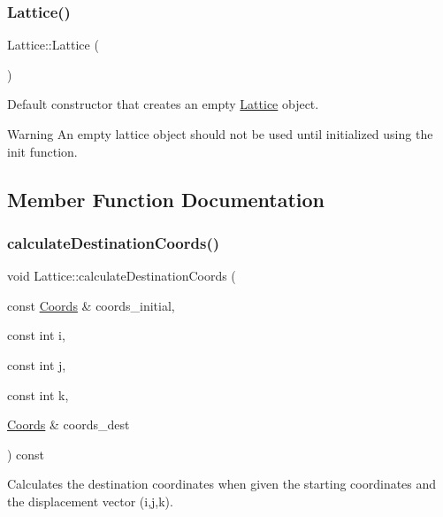 \subsubsection{\texorpdfstring{Lattice()}{Lattice()}}
{\footnotesize\ttfamily Lattice\+::\+Lattice (\begin{DoxyParamCaption}{ }\end{DoxyParamCaption})}



Default constructor that creates an empty \hyperlink{class_lattice}{Lattice} object. 

\begin{DoxyWarning}{Warning}
An empty lattice object should not be used until initialized using the init function. 
\end{DoxyWarning}


\subsection{Member Function Documentation}
\mbox{\label{class_lattice_aa6b80d6264bfc23ae5fea39abd2557d5}} 
\subsubsection{\texorpdfstring{calculate\+Destination\+Coords()}{calculateDestinationCoords()}}
{\footnotesize\ttfamily void Lattice\+::calculate\+Destination\+Coords (\begin{DoxyParamCaption}\item[{const \hyperlink{struct_coords}{Coords} \&}]{coords\+\_\+initial,  }\item[{const int}]{i,  }\item[{const int}]{j,  }\item[{const int}]{k,  }\item[{\hyperlink{struct_coords}{Coords} \&}]{coords\+\_\+dest }\end{DoxyParamCaption}) const}



Calculates the destination coordinates when given the starting coordinates and the displacement vector (i,j,k). 

